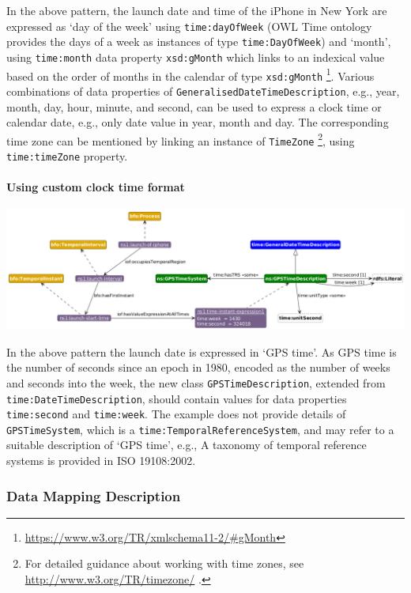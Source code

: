 In the above pattern, the launch date and time of the iPhone in New York are expressed as `day of the week' using \texttt{time:dayOfWeek} (OWL Time ontology provides the days of a week as instances of type \texttt{time:DayOfWeek})  and `month', using \texttt{time:month} data property \texttt{xsd:gMonth} which links to an indexical value based on the order of months in the calendar of type \texttt{xsd:gMonth} \footnote{\url{https://www.w3.org/TR/xmlschema11-2/\#gMonth}}.
Various combinations of data properties of \texttt{GeneralisedDateTimeDescription}, e.g.,  year, month, day, hour, minute, and second, can be used to express a clock time or calendar date, e.g., only date value in year, month and day. The corresponding time zone can be mentioned by linking an instance of \texttt{TimeZone} \footnote{For detailed guidance about working with time zones, see \url{http://www.w3.org/TR/timezone/} .}, using \texttt{time:timeZone} property.       

\paragraph{Using custom clock time format \\}

\includegraphics[scale=0.35]{scenarios/clock-time-calendar-date/images/uc1-custom.png}

In the above pattern the launch date is expressed in `GPS time'. As GPS time is the number of seconds since an epoch in 1980, encoded as the number of weeks and seconds into the week, the new class  \texttt{GPSTimeDescription}, extended from \texttt{time:DateTimeDescription}, should contain values for data properties \texttt{time:second} and \texttt{time:week}. The example does not provide details of \texttt{GPSTimeSystem}, which is a \texttt{time:TemporalReferenceSystem}, and may refer to a suitable description of `GPS time', e.g., A taxonomy of temporal reference systems is provided in ISO 19108:2002. 


\subsubsection*{Data Mapping Description}

